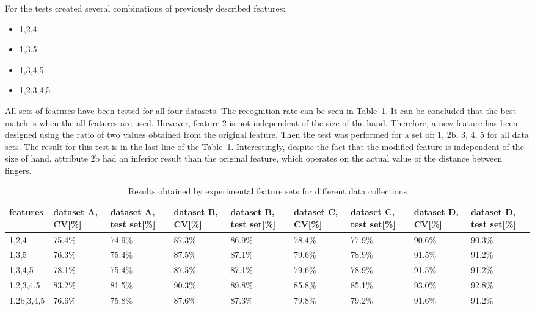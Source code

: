 For the tests created several combinations of previously described features:
\begin{itemize}
\item 1,2,4
\item 1,3,5
\item 1,3,4,5
\item 1,2,3,4,5
\end{itemize}

All sets of features have been tested for all four datasets. The recognition rate can be seen in Table~\ref{findiff}. It can be concluded that the best match is when the all features are used. However, feature 2 is not independent of the size of the hand. Therefore, a new feature has been designed using the ratio of two values obtained from the original feature. Then the test was performed for a set of: 1, 2b, 3, 4, 5 for all data sets. The result for this test is in the last line of the Table~\ref{findiff}. Interestingly, despite the fact that the modified feature is independent of the size of hand, attribute 2b had an inferior result than the original feature, which operates on the actual value of the distance between fingers. 

\begin{table}[htp!]
\begin{center}
	\label{findiff}
	\caption{Results obtained by experimental feature sets for different data collections}
    \begin{tabular}{|p{1.3cm}|p{1.3cm}|p{1.3cm}|p{1.3cm}|p{1.3cm}|p{1.3cm}|p{1.3cm}|p{1.3cm}|p{1.3cm}|}
    \hline
    features & dataset A, CV[\%] & dataset A, test set[\%] & dataset B, CV[\%] & dataset B, test set[\%] & dataset C, CV[\%]& dataset C, test set[\%]  & dataset D, CV[\%] & dataset D, test set[\%]  \\ \hline
    1,2,4	& 75.4\% & 74.9\% & 87.3\%  & 86.9\% & 78.4\% & 77.9\% & 90.6\% & 90.3\% \\ \hline
    1,3,5     	& 76.3\% & 75.4\% & 87.5\%  & 87.1\% & 79.6\% & 78.9\% & 91.5\% & 91.2\% \\ \hline
    1,3,4,5    	& 78.1\% & 75.4\% & 87.5\%  & 87.1\% & 79.6\% & 78.9\% & 91.5\% & 91.2\% \\ \hline
    1,2,3,4,5   & 83.2\% & 81.5\% & 90.3\%  & 89.8\% & 85.8\% & 85.1\% & 93.0\% & 92.8\% \\ \hline
    1,2b,3,4,5	& 76.6\% & 75.8\% & 87.6\%  & 87.3\% & 79.8\% & 79.2\% & 91.6\% & 91.2\% \\ \hline
    \end{tabular}
    \end{center}
\end{table}

